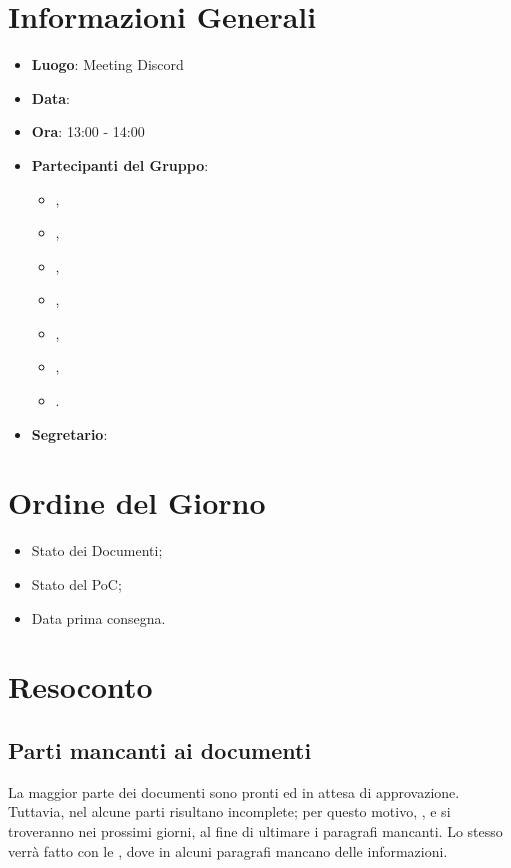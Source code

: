 \section{Informazioni Generali}

\begin{itemize}
\item{\textbf{Luogo}}: Meeting Discord
\item{\textbf{Data}}: \D
\item{\textbf{Ora}}: 13:00 - 14:00
\item{\textbf{Partecipanti del Gruppo}}: 
	\begin{itemize}
	\item{\EP{},} 
	\item{\FP{},}
	\item{\GC{},}
	\item{\LW{},}
	\item{\MB{},}
	\item{\MG{},}
	\item{\PV{}.}
	\end{itemize} 
\item{\textbf{Segretario}}: \PV{}	
\end{itemize}

\section{Ordine del Giorno}
\begin{itemize}
\item{Stato dei Documenti};
\item{Stato del PoC};
\item{Data prima consegna}.
\end{itemize}

\section{Resoconto}
 
\subsection{Parti mancanti ai documenti} 
La maggior parte dei documenti sono pronti ed in attesa di approvazione. Tuttavia, nel \textit{\PdP} alcune parti risultano incomplete; per questo motivo, \EP{}, \FP{} e \GC{} si troveranno nei prossimi giorni, al fine di ultimare i paragrafi mancanti. Lo stesso verrà fatto con le \textit{\NdP}, dove in alcuni paragrafi mancano delle informazioni.
 
